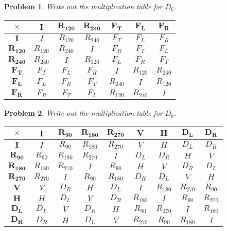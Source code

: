 \documentclass{article}
\newtheorem{problem}{Problem}
\begin{document}
\begin{problem}
Write out the multiplication table for $D_6$.
\end{problem}
\begin{tabular}{|c|c|c|c|c|c|c|}
\hline
$\mathbf{\times}$ & $\mathbf{I}$ & $\mathbf{R_{120}}$ & $\mathbf{R_{240}}$ & $\mathbf{F_T}$ & $\mathbf{F_L}$ & $\mathbf{F_R}$\\
\hline
$\mathbf{I}$ & $I$ & $R_{120}$ & $R_{240}$ & $F_T$ & $F_L$ & $F_R$\\
\hline
$\mathbf{R_{120}}$ & $R_{120}$ & $R_{240}$ & $I$ & $F_R$ & $F_T$ & $F_L$\\
\hline
$\mathbf{R_{240}}$ & $R_{240}$ & $I$ & $R_{120}$ & $F_L$ & $F_R$ & $F_T$\\
\hline
$\mathbf{F_T}$ & $F_T$ & $F_L$ & $F_R$ & $I$ & $R_{120}$ & $R_{240}$\\
\hline
$\mathbf{F_L}$ & $F_L$ & $F_R$ & $F_T$ & $R_{240}$ & $I$ & $R_{120}$\\
\hline
$\mathbf{F_R}$ & $F_R$ & $F_T$ & $F_L$ & $R_{120}$ & $R_{240}$ & $I$\\
\hline
\end{tabular}

\begin{problem}
Write out the multiplication table for $D_8$.
\end{problem}
\begin{tabular}{|c|c|c|c|c|c|c|c|c|}
\hline
$\mathbf{\times}$ & $\mathbf{I}$ & $\mathbf{R_{90}}$ & $\mathbf{R_{180}}$ & $\mathbf{R_{270}}$ & $\mathbf{V}$ & $\mathbf{H}$ & $\mathbf{D_L}$ & $\mathbf{D_R}$\\
\hline
$\mathbf{I}$ & $I$ & $R_{90}$ & $R_{180}$ & $R_{270}$ & $V$ & $H$ & $D_L$ & $D_R$\\
\hline
$\mathbf{R_{90}}$ & $R_{90}$ & $R_{180}$ & $R_{270}$ & $I$ & $D_L$ & $D_R$ & $H$ & $V$\\
\hline
$\mathbf{R_{180}}$ & $R_{180}$ & $R_{270}$ & $I$ & $R_{90}$ & $H$ & $V$ & $D_R$ & $D_L$\\
\hline
$\mathbf{R_{270}}$ & $R_{270}$ & $I$ & $R_{90}$ & $R_{180}$ & $D_R$ & $D_L$ & $V$ & $H$\\
\hline
$\mathbf{V}$ & $V$ & $D_R$ & $H$ & $D_L$ & $I$ & $R_{180}$ & $R_{270}$ & $R_{90}$\\
\hline
$\mathbf{H}$ & $H$ & $D_L$ & $V$ & $D_R$ & $R_{180}$ & $I$ & $R_{90}$ & $R_{270}$\\
\hline
$\mathbf{D_L}$ & $D_L$ & $V$ & $D_R$ & $H$ & $R_{90}$ & $R_{270}$ & $I$ & $R_{180}$\\
\hline
$\mathbf{D_R}$ & $D_R$ & $H$ & $D_L$ & $V$ & $R_{270}$ & $R_{90}$ & $R_{180}$ & $I$\\
\hline
\end{tabular}
\end{document}
